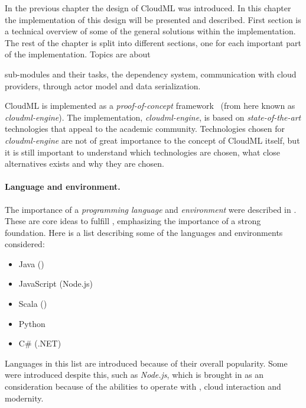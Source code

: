 
In the previous chapter the design of CloudML was introduced.
In this chapter the implementation of this design will be presented and described.
First section is a technical overview of some of the general solutions within 
the implementation.
The rest of the chapter is split into different sections, one for each important part of the implementation.
Topics are about
\begin{ii}
  \iitem sub-modules and their tasks,
  \iitem the dependency system,
  \iitem communication with cloud providers,
  \iitem {} through actor model and
  \iitem data serialization.
\end{ii}


CloudML is implemented as a \emph{proof-of-concept} framework~\cite{cloudml-engine}
(from here known as \emph{cloudml-engine}). 
The implementation, \emph{cloudml-engine}, 
is based on \emph{state-of-the-art} technologies that appeal to the academic community.
Technologies chosen for \emph{cloudml-engine} are not of great importance to the concept of CloudML itself,
but it is still important to understand which technologies are chosen, what close alternatives exists
and why they are chosen.

\paragraph{Language and environment.} 

The importance of a \emph{programming language} and \emph{environment} were
described in .
These are core ideas to fulfill , emphasizing the importance of a strong foundation.
Here is a list describing some of the languages and environments considered:
\begin{itemize}
  \item Java ()
  \item JavaScript (Node.js)
  \item Scala ()
  \item Python
  \item C\# (.NET)
\end{itemize}
Languages in this list are introduced because of their overall popularity.
Some were introduced despite this, such as \emph{Node.js}, 
which is brought in as an consideration because of the abilities to operate
with , cloud interaction and modernity.

